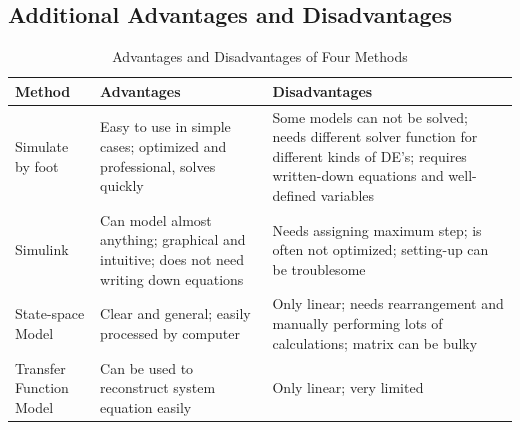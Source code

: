 \documentclass{article}
\begin{document}
  \subsection{Additional Advantages and Disadvantages}
    \begin{table}[htb]
    \setlength{\abovecaptionskip}{0pt}
    \setlength{\belowcaptionskip}{10pt}
    \setlength{\arrayrulewidth}{0.4mm}
    \renewcommand{\arraystretch}{1.5}
    \label{Tab 1}
    \caption{Advantages and Disadvantages of Four Methods}
    \begin{center}
    \begin{tabular}{m{3cm} m{5cm} m{5cm}}
    \hline 
    \hline
    Method & Advantages & Disadvantages\\
    \hline
    Simulate by foot
    & Easy to use in simple cases; optimized and professional, solves quickly
    & Some models can not be solved; needs different solver
      function for different kinds of DE's; requires written-down equations and well-defined variables\\
    Simulink
    & Can model almost anything; graphical and intuitive; does not need writing down equations
    & Needs assigning maximum step; is often not optimized;
      setting-up can be troublesome\\
    State-space Model
    & Clear and general; easily processed by computer
    & Only linear; needs rearrangement and manually performing lots of calculations; matrix can be bulky\\
    Transfer Function Model
    & Can be used to reconstruct system equation easily
    & Only linear; very limited\\
    \hline
    \hline
    \end{tabular}
    \end{center}
    \end{table}
  
  
\end{document}
